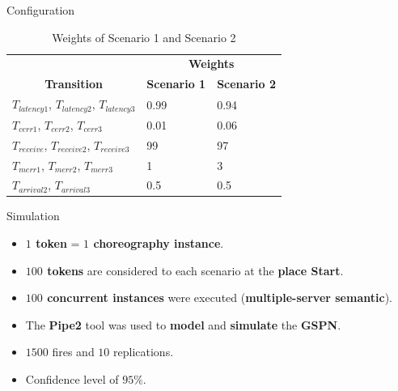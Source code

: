\documentclass[xcolor=svgnames]{beamer}
\begin{document}
  \begin{frame}{ Configuration}
        \begin{table}[!h]
            \centering
            \caption{Weights of Scenario 1 and Scenario 2}
            \label{table:transitionsConfigurations}
            \begin{tabular}{|l|l|l|}
              \cline{1-3}
        		    &   \multicolumn{2}{|c|}{ \textbf{Weights} } \\
              \cline{1-3}
               \multicolumn{1}{|c|}{\textbf{Transition} }     		&      \textbf{Scenario 1}   &   \textbf{Scenario 2} 		\\
               \hline
               $T_{latency1}$, $T_{latency2}$, $T_{latency3}$ 	& 	0.99       &   0.94	\\
               $T_{cerr1}$, $T_{cerr2}$, $T_{cerr3}$      	&  	0.01 	   &   0.06	\\
               $T_{receive}$, $T_{receive2}$, $T_{receive3}$  &  	99  	   &    97	\\
               $T_{merr1}$, $T_{merr2}$, $T_{merr3}$   &   1 	   &    3	\\
               $T_{arrival2}$, $T_{arrival3}$   &  0.5  &	0.5	\\
              \hline
            \end{tabular}
        \end{table}

  \end{frame}


  \begin{frame}{ Simulation}
   \begin{itemize}
     \item <1-> \textbf{$1$ token} = \textbf{$1$ choreography instance}.
     \item <2-> \textbf{$100$ tokens} are considered to each scenario at the \textbf{place Start}.
     \item <2-> \textbf{$100$ concurrent instances} were executed (\textbf{multiple-server semantic}).
     \item <3-> The \textbf{Pipe2} tool was used to \textbf{model} and \textbf{simulate} the \textbf{GSPN}.
     \item <4-> $1500$ fires and $10$ replications.
     \item <4-> Confidence level of $95\%$.
   \end{itemize}
  \end{frame}
\end{document}
